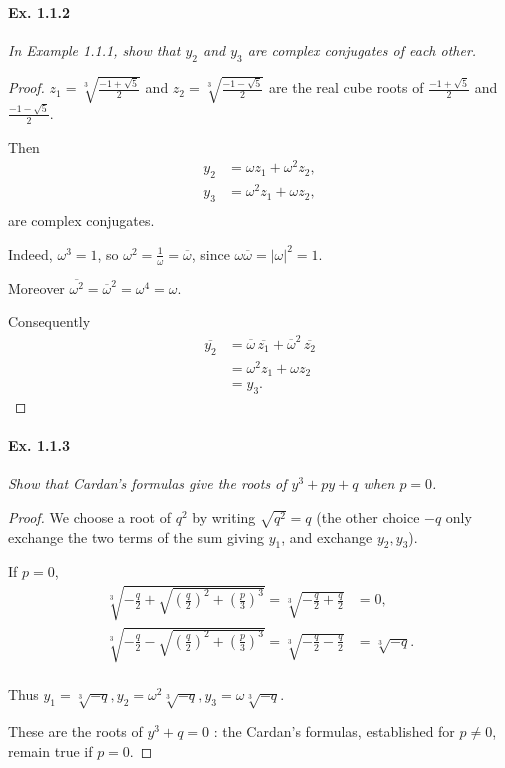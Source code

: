 \documentclass[11pt,a4paper]{article}
\begin{document}
\paragraph{Ex. 1.1.2}

{\it In Example 1.1.1, show that $y_2$ and $y_3$ are complex conjugates of each other.
}

\begin{proof}
$z_1 = \sqrt[3]{\frac{-1+\sqrt{5}}{2}}$ and $z_2 = \sqrt[3]{\frac{-1-\sqrt{5}}{2}}$ are the real cube roots of $\frac{-1+\sqrt{5}}{2}$ and $\frac{-1-\sqrt{5}}{2}$.

Then
\begin{align*}
y_2 &= \omega z_1 +\omega^2 z_2,\\
y_3 &= \omega^2 z_1 +\omega z_2,\\
\end{align*}
are complex conjugates.

Indeed, $ \omega^3 =1$, so $\omega^2 = \frac{1}{\omega} = \overline{\omega}$, since $\omega \overline{\omega} = \vert \omega \vert ^2= 1$.

Moreover $\overline{\omega^2} = \overline{\omega}^2 = \omega^4 = \omega$.

Consequently 
\begin{align*}
\overline{y_2} &= \overline{\omega}\, \overline{z_1} + \overline{\omega}^2\,  \overline{z_2}\\
&= \omega^2 z_1 + \omega z_2\\
&=y_3.
\end{align*}
\end{proof}

\paragraph{Ex. 1.1.3}

{\it Show that Cardan's formulas give the roots of $y^3+py+q$ when $p=0$.
}

\begin{proof}
We choose a root of $q^2$ by writing $\sqrt{q^2} = q$ (the other choice $-q$ only exchange the two terms of the sum giving $y_1$, and exchange  $y_2,y_3$).

If $p=0$, 
\begin{align*}
\sqrt[3]{-\frac{q}{2}+\sqrt{\left(\frac{q}{2}\right)^2 + \left(\frac{p}{3}\right)^3}}=\sqrt[3]{-\frac{q}{2}+\frac{q}{2}} &= 0,\\
\sqrt[3]{-\frac{q}{2}-\sqrt{\left(\frac{q}{2}\right)^2 + \left(\frac{p}{3}\right)^3}}=\sqrt[3]{-\frac{q}{2}-\frac{q}{2}} &= \sqrt[3]{-q}.\\
\end{align*}

Thus $y_1 = \sqrt[3]{-q}, y_2 = \omega^2 \sqrt[3]{-q}, y_3 = \omega \sqrt[3]{-q}$.

These are the roots of $y^3 + q=0$ : the Cardan's formulas, established for $p\neq 0$, remain true if $p=0$.
\end{proof}
\end{document}
